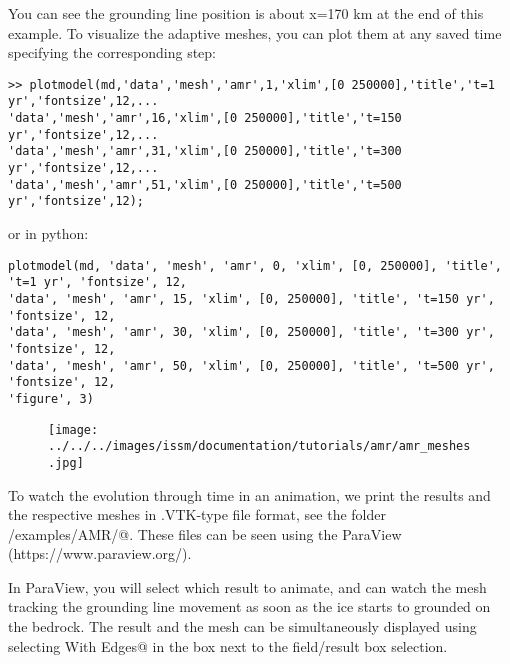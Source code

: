 You can see the grounding line position is about x=170 km at the end of this example. To visualize the adaptive meshes, you can plot them at any saved time specifying the corresponding step:
\begin{verbatim}>> plotmodel(md,'data','mesh','amr',1,'xlim',[0 250000],'title','t=1 yr','fontsize',12,...
'data','mesh','amr',16,'xlim',[0 250000],'title','t=150 yr','fontsize',12,...
'data','mesh','amr',31,'xlim',[0 250000],'title','t=300 yr','fontsize',12,...
'data','mesh','amr',51,'xlim',[0 250000],'title','t=500 yr','fontsize',12);\end{verbatim}
or in python:
\begin{verbatim}plotmodel(md, 'data', 'mesh', 'amr', 0, 'xlim', [0, 250000], 'title', 't=1 yr', 'fontsize', 12,
'data', 'mesh', 'amr', 15, 'xlim', [0, 250000], 'title', 't=150 yr', 'fontsize', 12,
'data', 'mesh', 'amr', 30, 'xlim', [0, 250000], 'title', 't=300 yr', 'fontsize', 12,
'data', 'mesh', 'amr', 50, 'xlim', [0, 250000], 'title', 't=500 yr', 'fontsize', 12,
'figure', 3)\end{verbatim}

\begin{figure}[H]
	\begin{center}
		\texttt{[image: ../../../images/issm/documentation/tutorials/amr/amr\_meshes.jpg]}
	\end{center}
\end{figure}

To watch the evolution through time in an animation, we print the results and the respective meshes in .VTK-type file format, see the folder \verb@trunk/examples/AMR/@. These files can be seen using the ParaView (https://www.paraview.org/).

In ParaView, you will select which result to animate, and can watch the mesh tracking the grounding line movement as soon as the ice starts to grounded on the bedrock. The result and the mesh can be simultaneously displayed using selecting \verb@Surface With Edges@ in the box next to the field/result box selection.
